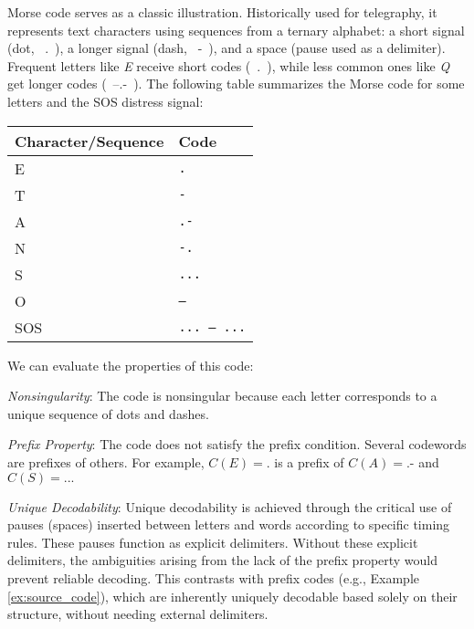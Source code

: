 \begin{example}\label{ex:morse_code}
    Morse code serves as a classic illustration. Historically used for telegraphy, it represents text characters using sequences from a ternary alphabet: a short signal (dot, ~.~), a longer signal (dash, ~-~), and a space (pause used as a delimiter). Frequent letters like \emph{E} receive short codes (~.~), while less common ones like \emph{Q} get longer codes (~--.-~).
    The following table summarizes the Morse code for some letters and the SOS distress signal:
    \begin{center}
        \begin{tabular}{ll}
            Character/Sequence & Code                 \\ \hline
            E                  & \texttt{.}           \\
            T                  & \texttt{-}           \\
            A                  & \texttt{.-}          \\
            N                  & \texttt{-.}          \\
            S                  & \texttt{...}         \\
            O                  & \texttt{---}         \\
            SOS                & \texttt{... --- ...} \\
        \end{tabular}
    \end{center}
    We can evaluate the properties of this code:

    \emph{Nonsingularity}: The code is nonsingular because each letter corresponds to a unique sequence of dots and dashes.

    \emph{Prefix Property}: The code does not satisfy the prefix condition. Several codewords are prefixes of others. For example, $C(E) = \texttt{.}$ is a prefix of $C(A) = \texttt{.-}$ and $C(S) = \texttt{...}$

    \emph{Unique Decodability}: Unique decodability is achieved through the critical use of pauses (spaces) inserted between letters and words according to specific timing rules. These pauses function as explicit delimiters. Without these explicit delimiters, the ambiguities arising from the lack of the prefix property would prevent reliable decoding. This contrasts with prefix codes (e.g., Example \ref{ex:source_code}), which are inherently uniquely decodable based solely on their structure, without needing external delimiters.
\end{example}



